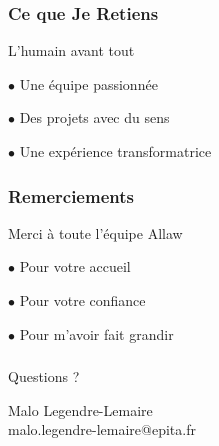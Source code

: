 \documentclass{beamer}
\begin{document}
\begin{frame}
\frametitle{Ce que Je Retiens}
\begin{center}
{\Large L'humain avant tout}

\vspace{1cm}
$\bullet$ Une équipe passionnée

\vspace{0.5cm}
$\bullet$ Des projets avec du sens

\vspace{0.5cm}
$\bullet$ Une expérience transformatrice
\end{center}
\end{frame}

\begin{frame}
\frametitle{Remerciements}
\begin{center}
{\Large Merci à toute l'équipe Allaw}

\vspace{1cm}
$\bullet$ Pour votre accueil

\vspace{0.5cm}
$\bullet$ Pour votre confiance

\vspace{0.5cm}
$\bullet$ Pour m'avoir fait grandir
\end{center}
\end{frame}

\begin{frame}
\frametitle{}
\begin{center}
{\Huge Questions ?}

\vspace{2cm}
{\large Malo Legendre-Lemaire}\\
{\small malo.legendre-lemaire@epita.fr}
\end{center}
\end{frame}
\end{document}
